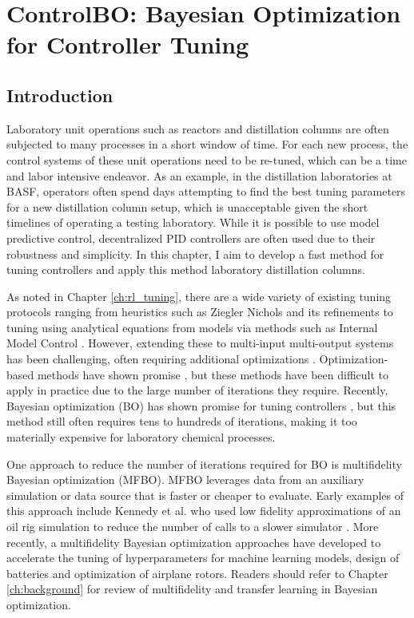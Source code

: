 \chapter{ControlBO: Bayesian Optimization for Controller Tuning}\label{ch:mfbo} 

\section{Introduction}
\label{sec:intro}
Laboratory unit operations such as reactors and distillation columns  are often subjected to many processes in a short window of time. For each new process, the control systems of these unit operations need to be re-tuned, which can be a time and labor intensive endeavor. As an example, in the distillation laboratories at BASF, operators often spend days attempting to find the best tuning parameters for a new distillation column setup, which is unacceptable given the short timelines of operating a testing laboratory. While it is possible to use model predictive control, decentralized PID controllers are often used due to their robustness and simplicity. In this chapter, I aim to develop a fast method for tuning controllers and apply this method laboratory distillation columns.

As noted in Chapter \ref{ch:rl_tuning}, there are a wide variety of existing tuning protocols ranging from heuristics such as Ziegler Nichols \cite{Ziegler1942} and its refinements \cite{Hang1991} to tuning using analytical equations from models via methods such as  Internal Model Control \cite{Copeland2010}. However, extending these to multi-input multi-output systems has been challenging, often requiring additional optimizations \cite{Nandong2013, Nandong2015}. Optimization-based methods have shown promise \cite{Pajares2019, Sumana2010, Rajapandiyan2012, Behroozsarand2012}, but these methods have been difficult to apply in practice due to the large number of iterations they require. Recently, Bayesian optimization (BO) has shown promise for tuning controllers \cite{NeumannBrosig2020, Fiducioso2019, Khosravi2020, Konig2020, Fujimoto2022, Brunzema2022, Khosravi2022}, but this method still often requires tens to hundreds of iterations, making it too materially expensive for laboratory chemical processes.

One approach to reduce the number of iterations required for BO is multifidelity Bayesian optimization (MFBO). MFBO leverages data from an auxiliary simulation or data source that is faster or cheaper to evaluate. Early examples of this approach include Kennedy et al. who used low fidelity approximations of an oil rig simulation to reduce the number of calls to a slower simulator \cite{Kennedy2000}. More recently, a multifidelity Bayesian optimization approaches have developed to accelerate the tuning of hyperparameters for machine learning models, design of batteries and optimization of airplane rotors. Readers should refer to Chapter \ref{ch:background} for review of multifidelity and transfer learning in Bayesian optimization.

